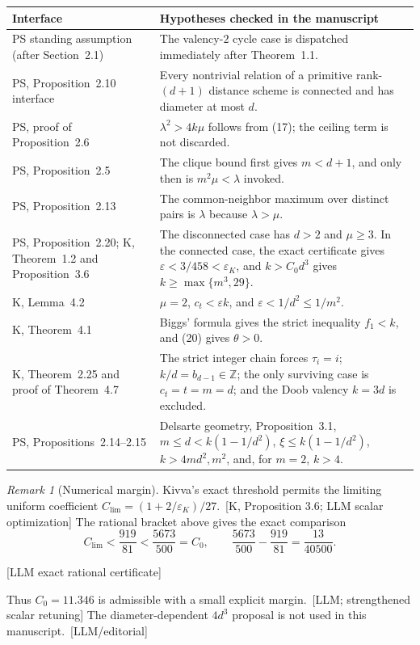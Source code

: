\documentclass[10pt]{amsart}
\theoremstyle{remark}
\newtheorem{remark}[theorem]{Remark}
\newcommand{\eps}{\varepsilon}
\newcommand{\prov}[1]{\unskip\, {\normalfont\scriptsize\color{provgray}\textsf{[#1]}}}
\newcommand{\eqprov}[1]{%
  \par\nobreak\vspace{-0.68\baselineskip}%
  \noindent\hfill{\normalfont\scriptsize\color{provgray}\textsf{[#1]}}%
  \par\vspace{0.20\baselineskip}%
}
\begin{document}
\renewcommand{\arraystretch}{1.18}
\begin{center}
\begin{tabular}{>{\raggedright\arraybackslash}p{}>{\raggedright\arraybackslash}p{}}
\toprule
\textbf{Interface} & \textbf{Hypotheses checked in the manuscript}\\
\midrule
PS standing assumption (after Section~2.1) & The valency-$2$ cycle case is dispatched immediately after Theorem~1.1.\\
PS, Proposition~2.10 interface & Every nontrivial relation of a primitive rank-$(d+1)$ distance scheme is connected and has diameter at most $d$.\\
PS, proof of Proposition~2.6 & $\lambda^2>4k\mu$ follows from (17); the ceiling term is not discarded.\\
PS, Proposition~2.5 & The clique bound first gives $m<d+1$, and only then is $m^2\mu<\lambda$ invoked.\\
PS, Proposition~2.13 & The common-neighbor maximum over distinct pairs is $\lambda$ because $\lambda>\mu$.\\
PS, Proposition~2.20; K, Theorem~1.2 and Proposition~3.6 & The disconnected case has $d>2$ and $\mu\ge3$. In the connected case, the exact certificate gives $\eps<3/458<\eps_K$, and $k>C_0d^3$ gives $k\ge\max\{m^3,29\}$.\\
K, Lemma~4.2 & $\mu=2$, $c_t<\eps k$, and $\eps<1/d^2\le1/m^2$.\\
K, Theorem~4.1 & Biggs' formula gives the strict inequality $f_1<k$, and (20) gives $\theta>0$.\\
K, Theorem~2.25 and proof of Theorem~4.7 & The strict integer chain forces $\tau_i=i$; $k/d=b_{d-1}\in\mathbb Z$; the only surviving case is $c_t=t=m=d$; and the Doob valency $k=3d$ is excluded.\\
PS, Propositions~2.14--2.15 & Delsarte geometry, Proposition~3.1, $m\le d<k(1-1/d^2)$, $\xi\le k(1-1/d^2)$, $k>4md^2,m^2$, and, for $m=2$, $k>4$.\\
\bottomrule
\end{tabular}
\end{center}

\begin{remark}[Numerical margin]
Kivva's exact threshold permits the limiting uniform coefficient $C_{\mathrm{lim}}=(1+2/\eps_K)/27$.\prov{K, Proposition 3.6; LLM scalar optimization} The rational bracket above gives the exact comparison
\[
C_{\mathrm{lim}}<\frac{919}{81}<\frac{5673}{500}=C_0,
\qquad
\frac{5673}{500}-\frac{919}{81}=\frac{13}{40500}.
\]
\eqprov{LLM exact rational certificate}
Thus $C_0=11.346$ is admissible with a small explicit margin.\prov{LLM; strengthened scalar retuning} The diameter-dependent $4d^3$ proposal is not used in this manuscript.\prov{LLM/editorial}
\end{remark}
\end{document}
